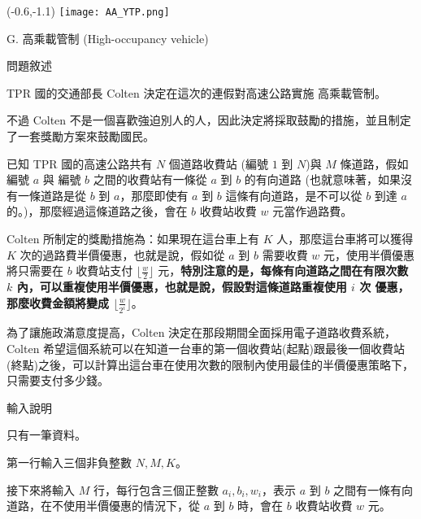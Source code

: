 \documentclass[12pt]{article}
\newcommand{\ProblemTitleFont}{\ProblemTitleMainFont\ProblemTitleCJKFont}
\newcommand{\ProblemTitle}[2]{\noindent\Large{\ProblemTitleFont #1 (#2)}\normalsize\par}
\newcommand{\ProblemSection}[1]{\vspace{0.6cm}\par\noindent\large{\ProblemTitleFont #1}\normalsize\par}
\newcommand{\ProblemStatement}{\ProblemSection{問題敘述}}
\newcommand{\ProblemInput}{\ProblemSection{輸入說明}}
\begin{document}

\begin{textblock}{0.1}(-0.6,-1.1)
	\texttt{[image: AA\_YTP.png]}
\end{textblock}




\renewcommand{\headrulewidth}{0pt}
\renewcommand{\baselinestretch}{1.3}
\setlength\parindent{24pt}
\setlength\parskip{12pt}
\cfoot{\thepage}

\ProblemTitle{G. 高乘載管制}{High-occupancy vehicle}

\ProblemStatement

TPR 國的交通部長 Colten 決定在這次的連假對高速公路實施 高乘載管制。

不過 Colten 不是一個喜歡強迫別人的人，因此決定將採取鼓勵的措施，並且制定了一套獎勵方案來鼓勵國民。

已知 TPR 國的高速公路共有 $N$ 個道路收費站 (編號 $1$ 到 $N$)與 $M$ 條道路，假如編號 $a$ 與 編號 $b$ 之間的收費站有一條從 $a$ 到 $b$ 的有向道路 (也就意味著，如果沒有一條道路是從 $b$ 到 $a$，那麼即使有 $a$ 到 $b$ 這條有向道路，是不可以從 $b$ 到達 $a$ 的。)，那麼經過這條道路之後，會在 $b$ 收費站收費 $w$ 元當作過路費。

Colten 所制定的獎勵措施為：如果現在這台車上有 $K$ 人，那麼這台車將可以獲得 $K$ 次的過路費半價優惠，也就是說，假如從 $a$ 到 $b$ 需要收費 $w$ 元，使用半價優惠將只需要在 $b$ 收費站支付 $\lfloor\frac{w}{2} \rfloor$ 元，\textbf{特別注意的是，每條有向道路之間在有限次數 $k$ 內，可以重複使用半價優惠，也就是說，假設對這條道路重複使用 $i$ 次 優惠，那麼收費金額將變成 $\lfloor\frac{w}{2^i} \rfloor$}。

為了讓施政滿意度提高，Colten 決定在那段期間全面採用電子道路收費系統，Colten 希望這個系統可以在知道一台車的第一個收費站(起點)跟最後一個收費站(終點)之後，可以計算出這台車在使用次數的限制內使用最佳的半價優惠策略下，只需要支付多少錢。

\ProblemInput

只有一筆資料。

第一行輸入三個非負整數 $N,M,K$。

接下來將輸入 $M$ 行，每行包含三個正整數 $a_i,b_i,w_i$，表示 $a$ 到 $b$ 之間有一條有向道路，在不使用半價優惠的情況下，從 $a$ 到 $b$ 時，會在 $b$ 收費站收費 $w$ 元。 
\end{document}

